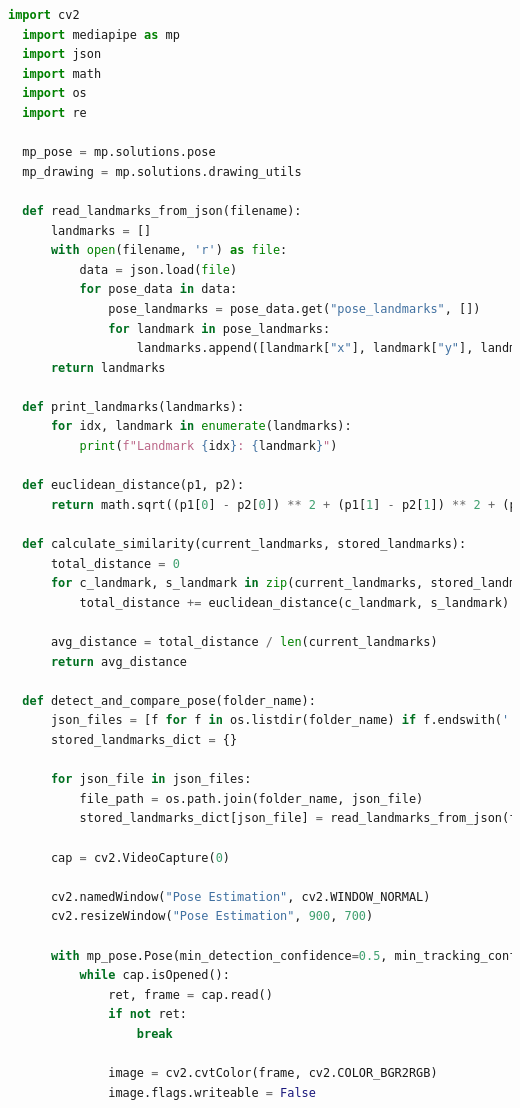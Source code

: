 \documentclass[a4paper,12pt]{article}
\begin{document}
\begin{lstlisting}[language=Python, caption={Kode Program untuk Menguji dan Membandingkan Pose}]
  import cv2
  import mediapipe as mp
  import json
  import math
  import os
  import re
  
  mp_pose = mp.solutions.pose
  mp_drawing = mp.solutions.drawing_utils
  
  def read_landmarks_from_json(filename):
      landmarks = []
      with open(filename, 'r') as file:
          data = json.load(file)
          for pose_data in data:
              pose_landmarks = pose_data.get("pose_landmarks", [])
              for landmark in pose_landmarks:
                  landmarks.append([landmark["x"], landmark["y"], landmark["z"]])
      return landmarks
  
  def print_landmarks(landmarks):
      for idx, landmark in enumerate(landmarks):
          print(f"Landmark {idx}: {landmark}")
  
  def euclidean_distance(p1, p2):
      return math.sqrt((p1[0] - p2[0]) ** 2 + (p1[1] - p2[1]) ** 2 + (p1[2] - p2[2]) ** 2)
  
  def calculate_similarity(current_landmarks, stored_landmarks):
      total_distance = 0
      for c_landmark, s_landmark in zip(current_landmarks, stored_landmarks):
          total_distance += euclidean_distance(c_landmark, s_landmark)
  
      avg_distance = total_distance / len(current_landmarks)
      return avg_distance
  
  def detect_and_compare_pose(folder_name):
      json_files = [f for f in os.listdir(folder_name) if f.endswith('.json')]
      stored_landmarks_dict = {}
  
      for json_file in json_files:
          file_path = os.path.join(folder_name, json_file)
          stored_landmarks_dict[json_file] = read_landmarks_from_json(file_path)
  
      cap = cv2.VideoCapture(0)
  
      cv2.namedWindow("Pose Estimation", cv2.WINDOW_NORMAL)
      cv2.resizeWindow("Pose Estimation", 900, 700)
  
      with mp_pose.Pose(min_detection_confidence=0.5, min_tracking_confidence=0.5) as pose:
          while cap.isOpened():
              ret, frame = cap.read()
              if not ret:
                  break
  
              image = cv2.cvtColor(frame, cv2.COLOR_BGR2RGB)
              image.flags.writeable = False
  

\end{lstlisting}
\end{document}
